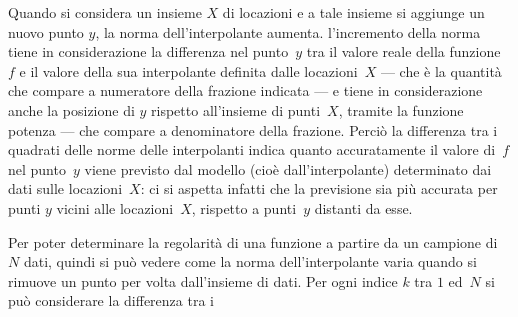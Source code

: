 Quando si considera un insieme $X$ di locazioni e a tale insieme si aggiunge un nuovo punto $y$, la norma dell'interpolante aumenta.  l'incremento della norma tiene in considerazione la differenza nel punto~$y$ tra il valore reale della funzione~$f$ e il valore della sua interpolante definita dalle locazioni~$X$ --- che è la quantità che compare a numeratore della frazione indicata --- e tiene in considerazione anche la posizione di $y$ rispetto all'insieme di punti~$X$, tramite la funzione potenza --- che compare a denominatore della frazione.  Perciò la differenza tra i quadrati delle norme delle interpolanti indica quanto accuratamente il valore di~$f$ nel punto~$y$ viene previsto dal modello (cioè dall'interpolante) determinato dai dati sulle locazioni~$X$: ci si aspetta infatti che la previsione sia più accurata per punti $y$ vicini alle locazioni~$X$, rispetto a punti~$y$ distanti da esse.



Per poter determinare la regolarità di una funzione a partire da un campione di~$N$ dati, quindi si può vedere come la norma dell'interpolante varia quando si rimuove un punto per volta dall'insieme di dati.  Per ogni indice $k$ tra $1$ ed~$N$ si può considerare la differenza tra i 

















  



\bye

